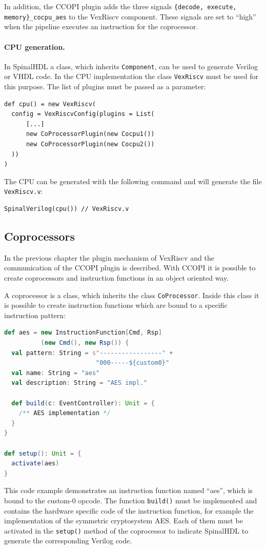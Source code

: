 \documentclass[twoside,twocolumn]{article}
\newcommand{\code}[1]{\texttt{#1}}
\begin{document}
In addition, the CCOPI plugin adds the three signals \code{\{decode,
execute, memory\}\_cocpu\_aes} to the VexRiscv component. These signals are
set to ``high'' when the pipeline executes an instruction for the
coprocessor.

\paragraph{CPU generation.} In SpinalHDL a class, which inherits
\code{Component}, can be used to generate Verilog or VHDL code. In the
CPU implementation the class \code{VexRiscv} must be used for this
purpose. The list of plugins must be passed as a parameter:
\begin{lstlisting}
def cpu() = new VexRiscv(
  config = VexRiscvConfig(plugins = List(
      [...]
      new CoProcessorPlugin(new Cocpu1())
      new CoProcessorPlugin(new Cocpu2())
  ))
)
\end{lstlisting}
The CPU can be generated with the following command and will generate
the file \code{VexRiscv.v}:
\begin{lstlisting}
SpinalVerilog(cpu()) // VexRiscv.v
\end{lstlisting}

\subsection{Coprocessors}
In the previous chapter the plugin mechanism of VexRiscv and the
communication of the CCOPI plugin is described. With CCOPI it is possible
to create coprocessors and instruction functions in an object oriented way.

A coprocessor is a class, which inherits the class
\code{CoProcessor}.
Inside this class it is possible to create instruction functions which are
bound to a specific instruction pattern:

\begin{lstlisting}[language=scala]
def aes = new InstructionFunction[Cmd, Rsp]
          (new Cmd(), new Rsp()) {
  val pattern: String = s"-----------------" +
                         "000-----${custom0}"
  val name: String = "aes"
  val description: String = "AES impl."

  def build(c: EventController): Unit = {
    /** AES implementation */
  }
}

def setup(): Unit = {
  activate(aes)
}
\end{lstlisting}
This code example demonstrates an instruction function named ``aes'', which
is bound to the custom-0 opcode. The function \code{build()} must be
implemented and contains the hardware specific code of the instruction
function, for example the implementation of the symmetric cryptosystem
AES. Each of them must be activated in the \code{setup()} method 
of the coprocessor to indicate SpinalHDL to generate the corresponding
Verilog code.
\end{document}
